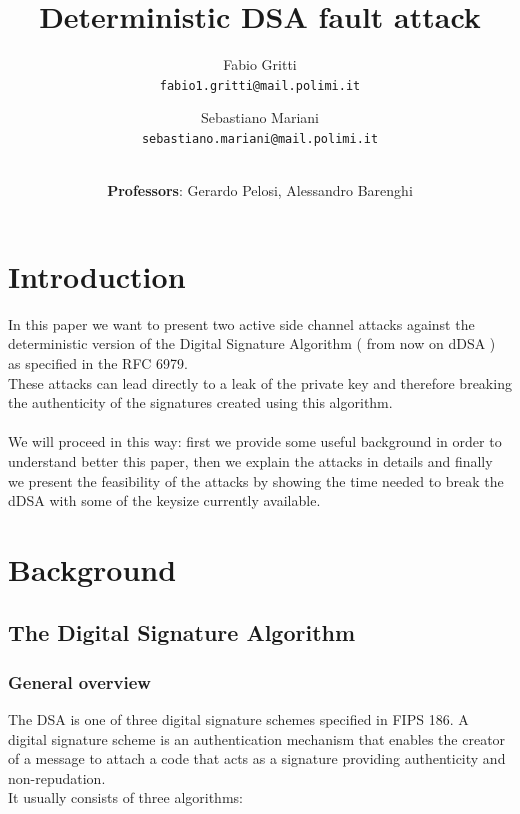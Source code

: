 \documentclass[11pt,english]{article}
\begin{document}
\title{\Huge{\textbf{Deterministic DSA fault attack}}}
\author{
  Fabio Gritti\\
  \texttt{fabio1.gritti@mail.polimi.it}
  \and
  Sebastiano Mariani\\
  \texttt{sebastiano.mariani@mail.polimi.it}
  \and \\
  \textbf{Professors}: Gerardo Pelosi, Alessandro Barenghi
}
\date{}
\maketitle

\pagestyle{plain}
\tableofcontents

\section{Introduction}
In this paper we want to present two active side channel attacks against the deterministic version of the Digital Signature Algorithm ( from now on dDSA ) as specified in the RFC 6979\cite{rfc}.\\
These attacks can lead directly to a leak of the private key and therefore breaking the authenticity of the signatures created using this algorithm. \\\\
We will proceed in this way: first we provide some useful background in order to understand better this paper, then we explain the attacks in details and finally we present the feasibility of the attacks by showing the time needed to break the dDSA with some of the keysize currently available.

\section{Background}

\subsection{The Digital Signature Algorithm}

\subsubsection{General overview}
The DSA is one of three digital signature schemes specified in FIPS 186\cite{fips}. A digital signature scheme is an authentication mechanism that enables the creator of a message to attach a code that acts as a signature providing authenticity and non-repudation. \\It usually consists of three algorithms:
\end{document}
